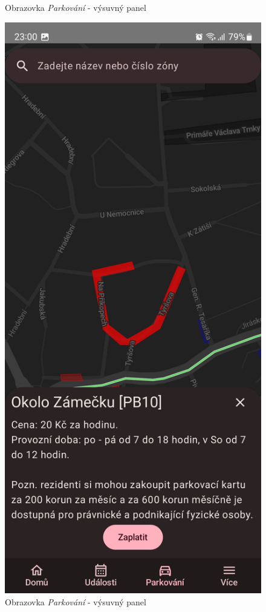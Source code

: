 \begin{figure}[H]
  \caption{Obrazovka \textit{Parkování} - výsuvný panel}
\endminipage\hfill
{}
  \includegraphics[width=\linewidth]{screens/3b_B.jpg}
  \caption{Obrazovka \textit{Parkování} - výsuvný panel}
\endminipage\hfill
\end{figure}

